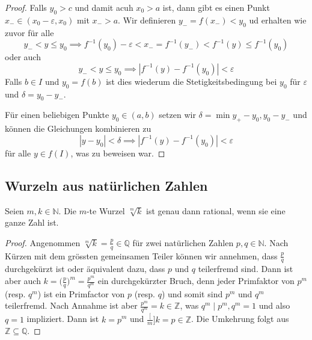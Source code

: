 \documentclass[../Analysis1_script.tex]{subfiles}
\begin{document}
\begin{proof}
	Falls $y_0 > c$ und damit acuh $x_0 > a$ ist, dann gibt es einen Punkt $x_- \in (x_0 - \varepsilon, x_0)$ mit $x_- > a$. Wir definieren $y_- = f(x_-) < y_0$ ud erhalten wie zuvor für alle
	\[y_- < y \leq y_0 \implies f^{-1}(y_0) - \varepsilon < x_- = f^{-1}(y_-) < f^{-1}(y) \leq f^{-1}(y_0)\]
	oder auch 
	\[y_- < y \leq y_0 \implies |f^{-1}(y) - f^{-1}(y_0)| < \varepsilon\]
	Falls $b \in I$ und $y_0 = f(b)$ ist dies wiederum die Stetigkeitsbedingung bei $y_0$ für $\varepsilon$ und $\delta = y_0 - y_-$.
	
	Für einen beliebigen Punkte $y_0 \in (a, b)$ setzen wir $\delta = \min{y_+ - y_0, y_0 - y_-}$ und können die Gleichungen kombinieren zu
	\[|y- y_0| < \delta \implies |f^{-1}(y) - f^{-1}(y_0)| < \varepsilon\]
	für alle $y \in f(I)$, was zu beweisen war.
\end{proof}

\subsection{Wurzeln aus natürlichen Zahlen}

\begin{lemma}
	Seien $m, k \in \mathbb{N}$. Die $m$-te Wurzel $\sqrt[m]{k}$ ist genau dann rational, wenn sie eine ganze Zahl ist.
\end{lemma}

\begin{proof}
	Angenommen $\sqrt[m]{k} = \frac{p}{q} \in \mathbb{Q}$ für zwei natürlichen Zahlen $p, q \in \mathbb{N}$. Nach Kürzen mit dem grössten gemeinsamen Teiler können wir annehmen, dass $\frac{p}{q}$ durchgekürzt ist oder äquivalent dazu, dass $p$ und $q$ teilerfremd sind. Dann ist aber auch $k = \big(\frac{p}{q}\big)^m = \frac{p^m}{q^m}$ ein durchgekürzter Bruch, denn jeder Primfaktor von $p^m$ (resp. $q^m$) ist ein Primfactor von $p$ (resp. $q$) und somit sind $p^m$ und $q^m$ teilerfremd. Nach Annahme ist aber $\frac{p^m}{q^m} = k \in \mathbb{Z}$, was $q^m \mid p^m, q^m = 1$ und also $q = 1$ impliziert. Dann ist $k = p^m$ und $\frac[m]{k} = p \in \mathbb{Z}$. Die Umkehrung folgt aus $\mathbb{Z} \subseteq \mathbb{Q}$.
\end{proof}
\end{document}
